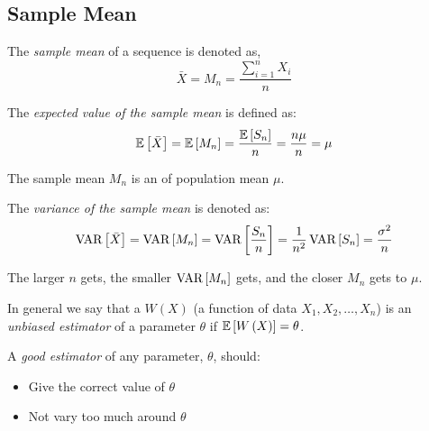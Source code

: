 	\subsection{Sample Mean} \label{subsec:Sample Mean}
		\begin{definition} \label{def:Sample Mean}
			The \emph{sample mean} of a sequence is denoted as,
			\begin{equation} \label{eq:Sample Mean}
				\bar{X} = M_{n} = \frac{\sum_{i=1}^{n} X_{i}}{n}
			\end{equation}
		\end{definition}
		\begin{definition} \label{def:Expected Value of Sample Mean}
			The \emph{expected value of the sample mean} is defined as:
			\begin{equation} \label{eq:Expected Value of Sample Mean}
				\operatorname{\mathbb{E}} \left[ \bar{X} \right]
				= \operatorname{\mathbb{E}} \left[ M_{n} \right]
				= \frac{\operatorname{\mathbb{E}} \left[ S_{n} \right]}{n}
				= \frac{n \mu}{n}
				= \mu
			\end{equation}
			\begin{remark}
				The sample mean $M_{n}$ is an \emph{} of population mean $\mu$.
			\end{remark}
		\end{definition}
		\begin{definition} \label{def:Variance of Sample Mean}
			The \emph{variance of the sample mean} is denoted as:
			\begin{equation} \label{eq:Variance of Sample Mean}
				\operatorname{\text{VAR}} \left[ \bar{X} \right]
				= \operatorname{\text{VAR}} \left[ M_{n} \right]
				= \operatorname{\text{VAR}} \left[ \frac{S_{n}}{n} \right]
				= \frac{1}{n^{2}} \operatorname{\text{VAR}} \left[ S_{n} \right]
				= \frac{\sigma^{2}}{n}
			\end{equation}
			\begin{remark}
				The larger $n$ gets, the smaller $\operatorname{\text{VAR}} \left[ M_{n} \right]$ gets, and the closer $M_{n}$ gets to $\mu$.
			\end{remark}
		\end{definition}
		\begin{definition} \label{def:Unbiased Estimator}
			In general we say that a  $W \left( X \right)$ (a function of data $X_{1},X_{2},\ldots,X_{n}$) is an \emph{unbiased estimator} of a parameter $\theta$ if $\operatorname{\mathbb{E}} \left[ W \left( X \right) \right] = \theta$.
			\begin{remark}
				A \emph{good estimator} of any parameter, $\theta$, should:
				\begin{itemize}[noitemsep, nolistsep]
					\item Give the correct value of $\theta$
					\item Not vary too much around $\theta$
				\end{itemize}
			\end{remark}
		\end{definition}
	
